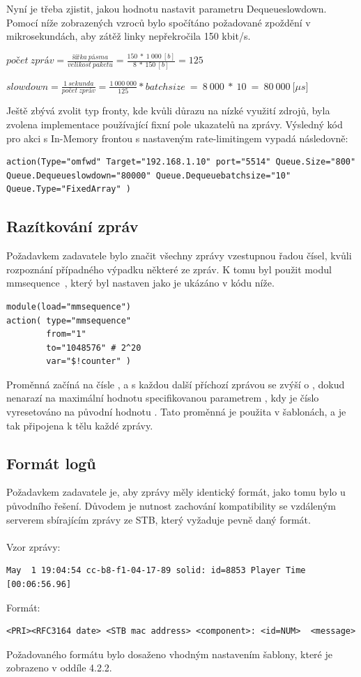 \documentclass[thesis=B,czech]{FITthesis}[2012/06/26]
\begin{document}
Nyní je třeba zjistit, jakou hodnotu nastavit parametru Dequeueslowdown. Pomocí níže zobrazených vzroců bylo spočítáno požadované zpoždění v mikrosekundách, aby zátěž linky nepřekročila 150 kbit/s.

\begin{description}
	\item $počet~zpráv=\frac{šířka~pásma}{velikost~paketu}=\frac{150~*~1~000~[b]}{8~*~150~[b]}=125$
	\item $slowdown=\frac{1~sekunda}{počet~zpráv}=\frac{1~000~000}{125}*batchsize~=~8~000~*~10~=~80~000~[\mu$$s]$
\end{description}
Ještě zbývá zvolit typ fronty, kde kvůli důrazu na nízké využití zdrojů, byla zvolena implementace používající fixní pole ukazatelů na zprávy.
Výsledný kód pro akci s In-Memory frontou s nastaveným rate-limitingem vypadá následovně:
\begin{lstlisting}[style=RainerScriptSimpleStyle]
action(Type="omfwd" Target="192.168.1.10" port="5514" Queue.Size="800" Queue.Dequeueslowdown="80000" Queue.Dequeuebatchsize="10" Queue.Type="FixedArray" )
\end{lstlisting}

\subsection{Razítkování zpráv}
Požadavkem zadavatele bylo značit všechny zprávy vzestupnou řadou čísel, kvůli rozpoznání případného výpadku některé ze zpráv.
K tomu byl použit modul mmsequence~\cite{RsyslogMmsequence}, který byl nastaven jako je ukázáno v kódu níže.
\begin{lstlisting}[style=RainerScriptSimpleStyle]
module(load="mmsequence")
action(	type="mmsequence"
		from="1"
		to="1048576" # 2^20
		var="$!counter" )
\end{lstlisting}
Proměnná  začíná na čísle , a s každou další příchozí zprávou se zvýší o , dokud nenarazí na maximální hodnotu specifikovanou parametrem , kdy je číslo vyresetováno na původní hodnotu .
Tato proměnná je použita v šablonách, a je tak připojena k tělu každé zprávy.

\subsection{Formát logů}
Požadavkem zadavatele je, aby zprávy měly identický formát, jako tomu bylo u původního řešení. Důvodem je nutnost zachování kompatibility se vzdáleným serverem sbírajícím zprávy ze STB, který vyžaduje pevně daný formát.
\\
\\
Vzor zprávy:
\begin{lstlisting}[style=RainerScriptSimpleStyle]
May  1 19:04:54 cc-b8-f1-04-17-89 solid: id=8853 Player Time [00:06:56.96]
\end{lstlisting}
Formát:
\begin{lstlisting}[style=RainerScriptSimpleStyle]
<PRI><RFC3164 date> <STB mac address> <component>: <id=NUM>  <message>
\end{lstlisting}
Požadovaného formátu bylo dosaženo vhodným nastavením šablony, které je zobrazeno v oddíle 4.2.2.
\clearpage
\end{document}
